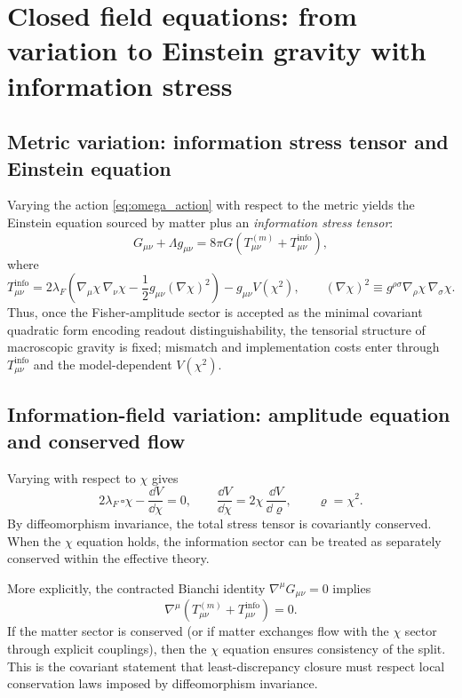 \section{Closed field equations: from variation to Einstein gravity with information stress}
\label{sec:field_equations}

\subsection{Metric variation: information stress tensor and Einstein equation}
\label{subsec:metric_variation}

Varying the action \eqref{eq:omega_action} with respect to the metric yields the Einstein equation sourced by matter plus an \emph{information stress tensor}:
\begin{equation}
  G_{\mu\nu} + \Lambda g_{\mu\nu}
  = 8\pi G\left(T^{(m)}_{\mu\nu} + T^{\mathrm{info}}_{\mu\nu}\right),
\end{equation}
where
\begin{equation}
  T^{\mathrm{info}}_{\mu\nu}
  = 2\lambda_{F}\left(\nabla_{\mu}\chi\,\nabla_{\nu}\chi - \frac{1}{2}g_{\mu\nu}(\nabla\chi)^{2}\right)
  - g_{\mu\nu} V(\chi^{2}),
  \qquad
  (\nabla\chi)^2 \equiv g^{\rho\sigma}\nabla_{\rho}\chi\,\nabla_{\sigma}\chi.
\end{equation}
Thus, once the Fisher-amplitude sector is accepted as the minimal covariant quadratic form encoding readout distinguishability, the tensorial structure of macroscopic gravity is fixed; mismatch and implementation costs enter through $T^{\mathrm{info}}_{\mu\nu}$ and the model-dependent $V(\chi^2)$.

\subsection{Information-field variation: amplitude equation and conserved flow}
\label{subsec:chi_variation}

Varying with respect to $\chi$ gives
\begin{equation}
  2\lambda_{F}\,\square \chi - \frac{\dd V}{\dd \chi} = 0,
  \qquad
  \frac{\dd V}{\dd \chi} = 2\chi\,\frac{\dd V}{\dd \varrho},
  \qquad
  \varrho=\chi^{2}.
\end{equation}
By diffeomorphism invariance, the total stress tensor is covariantly conserved. When the $\chi$ equation holds, the information sector can be treated as separately conserved within the effective theory.

More explicitly, the contracted Bianchi identity $\nabla^{\mu}G_{\mu\nu}=0$ implies
\begin{equation}
  \nabla^{\mu}\left(T^{(m)}_{\mu\nu}+T^{\mathrm{info}}_{\mu\nu}\right)=0.
\end{equation}
If the matter sector is conserved (or if matter exchanges flow with the $\chi$ sector through explicit couplings), then the $\chi$ equation ensures consistency of the split. This is the covariant statement that least-discrepancy closure must respect local conservation laws imposed by diffeomorphism invariance.

